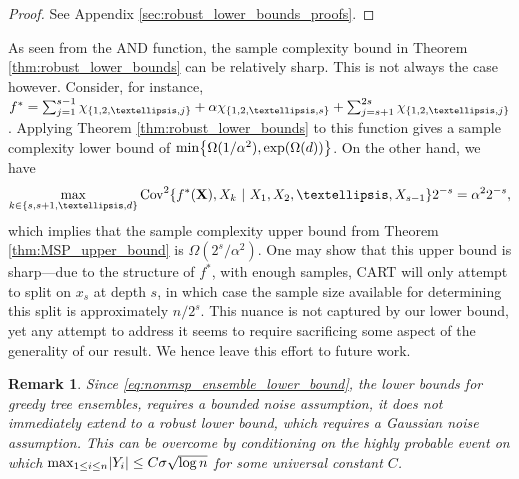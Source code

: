 \documentclass[11pt]{article}
\newtheorem{remark}[theorem]{Remark}
\newcommand{\bX}{\mathbf{X}}
\DeclarePairedDelimiter{\braces}{\lbrace}{\rbrace}
\DeclarePairedDelimiter{\abs}{|}{|}
\newcommand{\Cov}{\operatorname{Cov}}
\newcommand{\sparsity}{s}
\newcommand{\nfeats}{d}
\newcommand{\nsamples}{n}
\newcommand{\monomial}{\chi}
\begin{document}
\begin{proof}
    See Appendix \ref{sec:robust_lower_bounds_proofs}.
\end{proof}

As seen from the AND function, the sample complexity bound in Theorem \ref{thm:robust_lower_bounds} can be relatively sharp.
This is not always the case however.
Consider, for instance, $f^* = \sum_{j=1}^{\sparsity - 1} \monomial_{\braces*{1,2,\ldots,j}} + \alpha \monomial_{\braces*{1,2,\ldots,\sparsity}} + \sum_{j=\sparsity+1}^{2\sparsity} \monomial_{\braces*{1,2,\ldots,j}}$.
Applying Theorem \ref{thm:robust_lower_bounds} to this function gives a sample complexity lower bound of $\min\braces*{\Omega(1/\alpha^2),\exp(\Omega(\nfeats))}$.
On the other hand, we have
\begin{equation}
    \max_{k \in \braces*{s,s+1,\ldots,\nfeats}}\Cov^2\braces*{f^*(\bX),X_k~|~X_1,X_2,\ldots,X_{s-1}}2^{-s} = \alpha^2 2^{-s},
\end{equation}
which implies that the sample complexity upper bound from Theorem \ref{thm:MSP_upper_bound} is $\Omega(2^s/\alpha^2)$.
One may show that this upper bound is sharp---due to the structure of $f^*$, with enough samples, CART will only attempt to split on $x_s$ at depth $s$, in which case the sample size available for determining this split is approximately $n/2^s$.
This nuance is not captured by our lower bound, yet any attempt to address it seems to require sacrificing some aspect of the generality of our result.
We hence leave this effort to future work.

\begin{remark}
    Since \eqref{eq:nonmsp_ensemble_lower_bound}, the lower bounds for greedy tree ensembles, requires a bounded noise assumption, it does not immediately extend to a robust lower bound, which requires a Gaussian noise assumption.
    This can be overcome by conditioning on the highly probable event on which $\max_{1 \leq i \leq \nsamples}\abs*{Y_i} \leq C\sigma\sqrt{\log\nsamples}$ for some universal constant $C$.
\end{remark}
\end{document}
